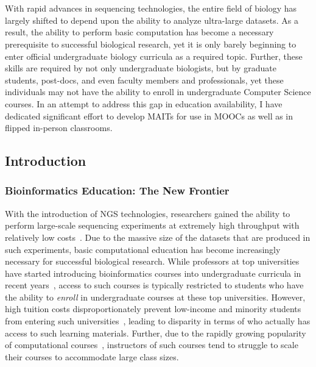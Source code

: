 \chapter{\educationtitle}
\label{chap:education}
\clearpage

With rapid advances in sequencing technologies, the entire field of biology has largely shifted to depend upon the ability to analyze ultra-large datasets. As a result, the ability to perform basic computation has become a necessary prerequisite to successful biological research, yet it is only barely beginning to enter official undergraduate biology curricula as a required topic. Further, these skills are required by not only undergraduate biologists, but by graduate students, post-docs, and even faculty members and professionals, yet these individuals may not have the ability to enroll in undergraduate Computer Science courses. In an attempt to address this gap in education availability, I have dedicated significant effort to develop \glspl{MAIT} for use in \glspl{MOOC} as well as in flipped in-person classrooms.

\section{Introduction}
\subsection{Bioinformatics Education: The New Frontier}
With the introduction of \gls{NGS} technologies, researchers gained the ability to perform large-scale sequencing experiments at extremely high throughput with relatively low costs~\cite{Metzker2010}. Due to the massive size of the datasets that are produced in such experiments, basic computational education has become increasingly necessary for successful biological research. While professors at top universities have started introducing bioinformatics courses into undergraduate curricula in recent years~\cite{Compeau2019,Mulder2018,Madlung2018}, access to such courses is typically restricted to students who have the ability to \textit{enroll} in undergraduate courses at these top universities. However, high tuition costs disproportionately prevent low-income and minority students from entering such universities~\cite{Wetzel1998}, leading to disparity in terms of who actually has access to such learning materials. Further, due to the rapidly growing popularity of computational courses~\cite{Camp2017}, instructors of such courses tend to struggle to scale their courses to accommodate large class sizes.

